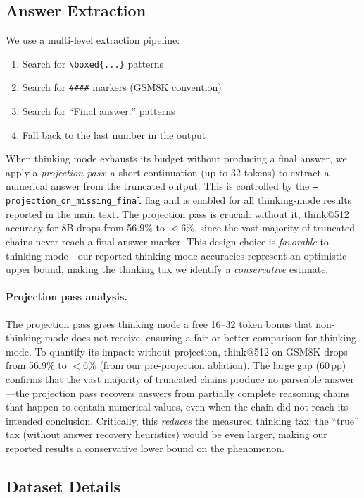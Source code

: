 \subsection{Answer Extraction}
We use a multi-level extraction pipeline:
\begin{enumerate}[nosep,leftmargin=*]
    \item Search for \texttt{\textbackslash boxed\{...\}} patterns
    \item Search for \texttt{\#\#\#\#} markers (GSM8K convention)
    \item Search for ``Final answer:'' patterns
    \item Fall back to the last number in the output
\end{enumerate}
When thinking mode exhausts its budget without producing a final answer,
we apply a \emph{projection pass}: a short continuation
(up to 32 tokens) to extract a numerical answer from the truncated output.
This is controlled by the \texttt{--projection\_on\_missing\_final} flag
and is enabled for all thinking-mode results reported in the main text.
The projection pass is crucial: without it, think@512 accuracy for 8B
drops from 56.9\% to ${<}$6\%, since the vast majority of truncated
chains never reach a final answer marker.
This design choice is \emph{favorable} to thinking mode---our
reported thinking-mode accuracies represent an optimistic upper bound,
making the thinking tax we identify a \emph{conservative} estimate.

\paragraph{Projection pass analysis.}
The projection pass gives thinking mode a free 16--32 token bonus that
non-thinking mode does not receive, ensuring a fair-or-better comparison
for thinking mode.
To quantify its impact: without projection, think@512 on GSM8K drops
from 56.9\% to ${<}$6\% (from our pre-projection ablation).
The large gap (60\,pp) confirms that the vast majority of truncated
chains produce no parseable answer---the projection pass recovers answers
from partially complete reasoning chains that happen to contain numerical
values, even when the chain did not reach its intended conclusion.
Critically, this \emph{reduces} the measured thinking tax: the
``true'' tax (without answer recovery heuristics) would be even larger,
making our reported results a conservative lower bound on the phenomenon.

\subsection{Dataset Details}
